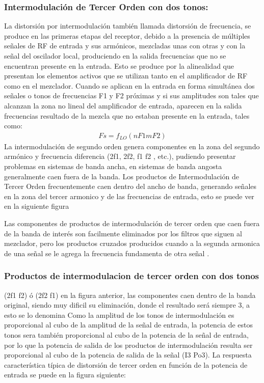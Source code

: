 \documentclass[letterpaper,11pt,spanish]{sphinxmanual}
\begin{document}
\subsubsection{Intermodulación de Tercer Orden con dos tonos:}
\label{\detokenize{introduccion/sistemas:Intermodulaci_xf3n-de-Tercer-Orden-con-dos-tonos:}}
La distorsión por intermodulación también llamada distorsión de frecuencia, se produce en las primeras etapas del receptor, debido a la presencia de múltiples señales de RF de entrada y sus armónicos, mezcladas unas con otras y con la señal del oscilador local, produciendo en la salida frecuencias que no se encuentran presente en la entrada. Esto se produce por la alinealidad que presentan los elementos activos que se utilizan tanto en el amplificador de RF como en el mezclador. Cuando se
aplican en la entrada en forma simultánea dos señales o tonos de frecuencias F1 y F2 próximas y si sus amplitudes son tales que alcanzan la zona no lineal del amplificador de entrada, aparecen en la salida frecuencias resultado de la mezcla que no estaban presente en la entrada, tales como:
\begin{equation*}
\begin{split}Fs  =  f_{LO} ( nF1 mF2)\end{split}
\end{equation*}
La intermodulación de segundo orden genera componentes en la zona del segundo armónico y frecuencia diferencia (2f1, 2f2, f1 f2 , etc.), pudiendo presentar problemas en sistemas de banda ancha, en sistemas de banda angosta generalmente caen fuera de la banda. Los productos de Intermodulación de Tercer Orden frecuentemente caen dentro del ancho de banda, generando señales en la zona del tercer armonico y de las frecuencias de entrada, esto se puede ver en la siguiente figura

Las componentes de productos de intermodulación de tercer orden que caen fuera de la banda de interés son facilmente eliminados por los filtros que siguen al mezclador, pero los productos cruzados producidos cuando a la segunda armonica de una señal se le agrega la frecuencia fundamenta de otra señal .


\subsubsection{Productos de intermodulacion de tercer orden con dos tonos}
\label{\detokenize{introduccion/sistemas:Productos-de-intermodulacion-de-tercer-orden-con-dos-tonos}}
(2f1 \textendash{} f2) ó (2f2 \textendash{} f1) en la figura anterior, las componentes caen dentro de la banda original, siendo muy dificil su eliminación, donde el resultado será siempre 3, a esto se lo denomina Como la amplitud de los tonos de intermodulación es proporcional al cubo de la amplitud de la señal de entrada, la potencia de estos tonos sera también proporcional al cubo de la potencia de la señal de entrada, por lo que la potencia de salida de los productos de intermodulación resulta ser proporcional al
cubo de la potencia de salida de la señal (I3 Po3). La respuesta característica típica de distorsión de tercer orden en función de la potencia de entrada se puede en la figura siguiente:
\end{document}
